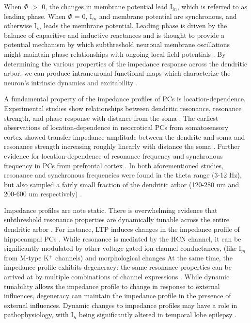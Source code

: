 \documentclass[utf8]{frontiersSCNS} %
\begin{document}
When $\Phi$ $>$ 0, the changes in membrane potential lead  I$_{in}$, which is referred to as leading phase.
When $\Phi$ = 0, I$_{in}$ and membrane potential are synchronous, and otherwise I$_{in}$ leads the membrane potential.
Leading phase is driven by the balance of capacitive and inductive reactances and is thought to provide a potential 
mechanism by which subthreshold neuronal membrane oscillations might maintain phase relationships with ongoing
local field potentials
\citep{Mauro1961-ys, Sabah1969-at, Mauro1970-km, Hu2002-ga, Hu2009-qb, Ulrich2002-dd, Cook2007-cz, Narayanan2008-zw, Vaidya2013-sx, Das2017-nz}.  
By determining the various properties of the impedance response across the dendritic arbor, we can produce intraneuronal 
functional maps which characterize the neuron's intrinsic dynamics and excitability \citep{Narayanan2012-hn}.

A fundamental property of the impedance profiles of PCs is location-dependence. Experimental
studies show relationships between dendritic resonance, resonance strength, and 
phase response with distance from the soma \citep{Das2017-nz, Narayanan2007-gw, Ulrich2002-dd, Dembrow2015-zb}.
The earliest observations of location-dependence in neocrotical PCs from somatosensory cortex 
showed transfer impedance amplitude between the dendrite and soma and resonance strength 
increasing roughly linearly with distance the soma \citep{Ulrich2002-dd}. Further evidence for 
location-dependence of resonance frequency and synchronous frequency in PCs from prefrontal cortex \citep{Dembrow2015-zb}.
In both aforementioned studies, resonance and synchronous frequencies were found in the theta 
range (3-12 Hz), but also sampled a fairly small fraction of the dendritic arbor (120-280 um and 
200-600 um respectively) \citep{Ulrich2002-dd, Dembrow2015-zb}.

Impedance profiles are note static.  There is overwhelming evidence that subthreshold resonance
properties are dynamically tunable across the entire dendritic arbor \citep{Magee2005-oq, Narayanan2007-gw, Narayanan2008-zw, Sjostrom2008-sz, Hu2009-qb, Rathour2012-am, Rathour2012-bu, Das2017-nz}.
For instance, LTP induces changes in the impedance profile of hippocampal PCs \citep{Narayanan2007-gw}.
While resonance is mediated by the HCN channel, it can be significantly modulated by other voltage-gated ion channel conductances, (like I$_m$ from M-type K$^+$ channels)
and morphological changes \citep{Hutcheon2000-gs, Hu2002-ga, Narayanan2008-zw, Zemankovics2010-zt, Rathour2012-bu, Dhupia2014-ad, Rathour2016-vv}
At the same time, the impedance profile exhibits degeneracy: the same resonance properties can be arrived at by
multiple combinations of channel expressions \citep{Rathour2012-bu, Rathour2014-pl, Das2017-nz}. While dynamic 
tunability allows the impedance profile to change in response to external influences, degeneracy can maintain the 
impedance profile in the presence of external influences.  Dynamic changes to impedance profiles may have a role in
pathophysiology, with I$_h$ being significantly altered in temporal lobe epilepsy \citep{Shin2008-za, Marcelin2009-vy}.
\end{document}

